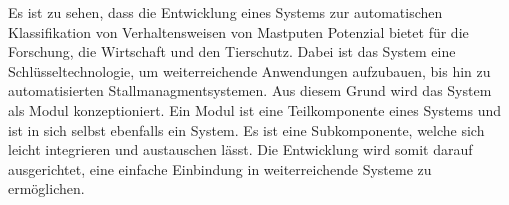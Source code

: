 Es ist zu sehen, dass die Entwicklung eines Systems zur automatischen Klassifikation von Verhaltensweisen von Mastputen Potenzial bietet für die Forschung, die Wirtschaft und den Tierschutz. Dabei ist das System eine Schlüsseltechnologie, um weiterreichende Anwendungen aufzubauen, bis hin zu automatisierten Stallmanagmentsystemen. Aus diesem Grund wird das System als Modul konzeptioniert. Ein Modul ist eine Teilkomponente eines Systems und ist in sich selbst ebenfalls ein \gls{System}. Es ist eine Subkomponente, welche sich leicht integrieren und austauschen lässt. Die Entwicklung wird somit darauf ausgerichtet, eine einfache Einbindung in weiterreichende Systeme zu ermöglichen. 

